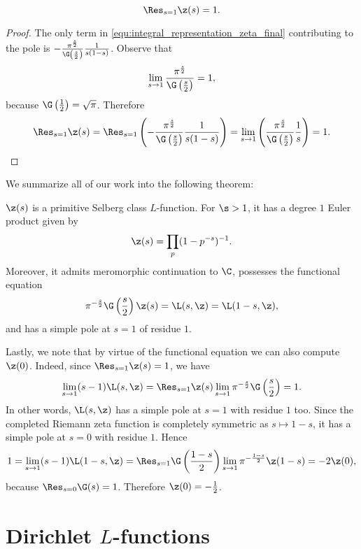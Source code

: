       \begin{proposition}\label{prop:zeta_residue}
        \[
          \Res_{s = 1}\z(s) = 1.
        \]
      \end{proposition}
      \begin{proof}
        The only term in \cref{equ:integral_representation_zeta_final} contributing to the pole is $-\frac{\pi^{\frac{s}{2}}}{\G\left(\frac{s}{2}\right)}\frac{1}{s(1-s)}$. Observe that
        \[
          \lim_{s \to 1}\frac{\pi^{\frac{s}{2}}}{\G\left(\frac{s}{2}\right)} = 1,
        \]
        because $\G\left(\frac{1}{2}\right) = \sqrt{\pi}$. Therefore
        \[
          \Res_{s = 1}\z(s) = \Res_{s = 1}\left(-\frac{\pi^{\frac{s}{2}}}{\G\left(\frac{s}{2}\right)}\frac{1}{s(1-s)}\right) = \lim_{s \to 1}\left(\frac{\pi^{\frac{s}{2}}}{\G\left(\frac{s}{2}\right)}\frac{1}{s}\right) = 1.
        \]
      \end{proof}

      We summarize all of our work into the following theorem:

      \begin{theorem}\label{thm:zeta_Selberg}
        $\z(s)$ is a primitive Selberg class $L$-function. For $\s > 1$, it has a degree $1$ Euler product given by
        \[
          \z(s) = \prod_{p}(1-p^{-s})^{-1}.
        \]
        Moreover, it admits meromorphic continuation to $\C$, possesses the functional equation
        \[
          \pi^{-\frac{s}{2}}\G\left(\frac{s}{2}\right)\z(s) = \L(s,\z) = \L(1-s,\z),
        \]
        and has a simple pole at $s = 1$ of residue $1$.
      \end{theorem}

      Lastly, we note that by virtue of the functional equation we can also compute $\z(0)$. Indeed, since $\Res_{s = 1}\z(s) = 1$, we have
      \[
        \lim_{s \to 1}(s-1)\L(s,\z) = \Res_{s = 1}\z(s)\lim_{s \to 1}\pi^{-\frac{s}{2}}\G\left(\frac{s}{2}\right) = 1.
      \]
      In other words, $\L(s,\z)$ has a simple pole at $s = 1$ with residue $1$ too. Since the completed Riemann zeta function is completely symmetric as $s \mapsto 1-s$, it has a simple pole at $s = 0$ with residue $1$. Hence
      \[
        1 = \lim_{s \to 1}(s-1)\L(1-s,\z) = \Res_{s = 1}\G\left(\frac{1-s}{2}\right)\lim_{s \to 1}\pi^{-\frac{1-s}{2}}\z(1-s) = -2\z(0),
      \]
      because $\Res_{s = 0}\G(s) = 1$. Therefore $\z(0) = -\frac{1}{2}$.
  \section{Dirichlet \texorpdfstring{$L$}{L}-functions}
